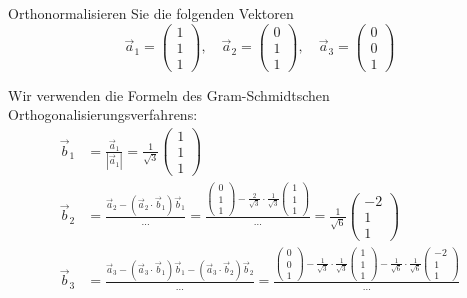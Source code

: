 Orthonormalisieren Sie die folgenden Vektoren
\[
\vec a_1=\begin{pmatrix}1\\1\\1\end{pmatrix},\quad
\vec a_2=\begin{pmatrix}0\\1\\1\end{pmatrix},\quad
\vec a_3=\begin{pmatrix}0\\0\\1\end{pmatrix}
\]


\begin{loesung}
Wir verwenden die Formeln des Gram-Schmidtschen Orthogonalisierungsverfahrens:
\begin{align*}
\vec b_1&=\frac{\vec a_1}{|\vec a_1|}=\frac1{\sqrt{3}}\begin{pmatrix}1\\1\\1\end{pmatrix}
\\
\vec b_2&=\frac{\vec a_2-(\vec a_2\cdot\vec b_1)\vec b_1}{\dots}
=
\frac{\begin{pmatrix}0\\1\\1\end{pmatrix}-\frac{2}{\sqrt{3}}\cdot\frac1{\sqrt{3}}\begin{pmatrix}1\\1\\1\end{pmatrix}}{\dots}
=
\frac1{\sqrt{6}}\begin{pmatrix}-2\\1\\1\end{pmatrix}
\\
\vec b_3
&=
\frac{\vec a_3-(\vec a_3\cdot\vec b_1)\vec b_1-(\vec a_3\cdot\vec b_2)\vec b_2}{\dots}
=
\frac{\begin{pmatrix}0\\0\\1\end{pmatrix}
-\frac1{\sqrt{3}}\cdot\frac1{\sqrt{3}}\begin{pmatrix}1\\1\\1\end{pmatrix}
-\frac1{\sqrt{6}}\cdot\frac1{\sqrt{6}}\begin{pmatrix}-2\\1\\1\end{pmatrix}}{\dots}\\

\end{align*}
\end{loesung}

